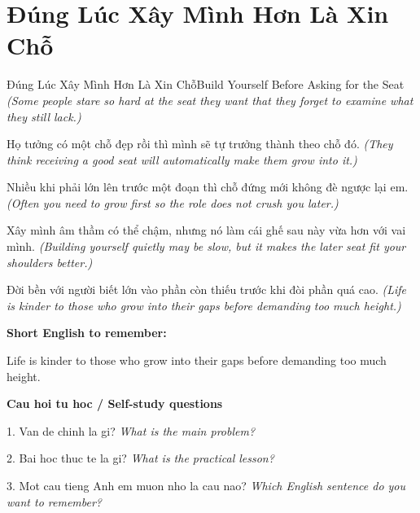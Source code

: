 \section{Đúng Lúc Xây Mình Hơn Là Xin Chỗ}
\begin{truyen}{Đúng Lúc Xây Mình Hơn Là Xin Chỗ}{Build Yourself Before Asking for the Seat}
\textit{(Some people stare so hard at the seat they want that they forget to examine what they still lack.)}

Họ tưởng có một chỗ đẹp rồi thì mình sẽ tự trưởng thành theo chỗ đó.
\textit{(They think receiving a good seat will automatically make them grow into it.)}

Nhiều khi phải lớn lên trước một đoạn thì chỗ đứng mới không đè ngược lại em.
\textit{(Often you need to grow first so the role does not crush you later.)}

Xây mình âm thầm có thể chậm, nhưng nó làm cái ghế sau này vừa hơn với vai mình.
\textit{(Building yourself quietly may be slow, but it makes the later seat fit your shoulders better.)}

\end{truyen}

\begin{baihoc}
Đời bền với người biết lớn vào phần còn thiếu trước khi đòi phần quá cao.
\textit{(Life is kinder to those who grow into their gaps before demanding too much height.)}
\end{baihoc}

\begin{ghinhoanh}
\textbf{Short English to remember:}

Life is kinder to those who grow into their gaps before demanding too much height.

\end{ghinhoanh}

\begin{tuhocnhanh}
\textbf{Cau hoi tu hoc / Self-study questions}

1. Van de chinh la gi? \textit{What is the main problem?}

2. Bai hoc thuc te la gi? \textit{What is the practical lesson?}

3. Mot cau tieng Anh em muon nho la cau nao? \textit{Which English sentence do you want to remember?}
\end{tuhocnhanh}
